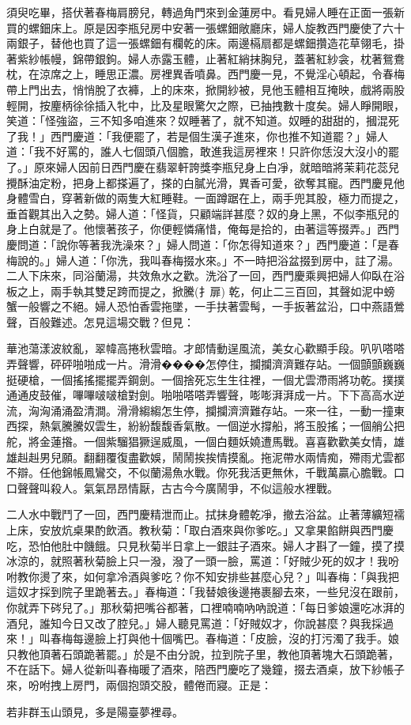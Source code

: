 須臾吃畢，搭伏著春梅肩膀兒，轉過角門來到金蓮房中。看見婦人睡在正面一張新買的螺鈿床上。原是因李瓶兒房中安著一張螺鈿敞廳床，婦人旋教西門慶使了六十兩銀子，替他也買了這一張螺鈿有欄乾的床。兩邊槅扇都是螺鈿攢造花草翎毛，掛著紫紗帳幔，錦帶銀鉤。婦人赤露玉體，止著紅綃抹胸兒，蓋著紅紗衾，枕著鴛鴦枕，在涼席之上，睡思正濃。房裡異香噴鼻。西門慶一見，不覺淫心頓起，令春梅帶上門出去，悄悄脫了衣褲，上的床來，掀開紗被，見他玉體相互掩映，戲將兩股輕開，按麈柄徐徐插入牝中，比及星眼驚欠之際，已抽拽數十度矣。婦人睜開眼，笑道：「怪強盜，三不知多咱進來？奴睡著了，就不知道。奴睡的甜甜的，摑混死了我！」西門慶道：「我便罷了，若是個生漢子進來，你也推不知道罷？」婦人道：「我不好罵的，誰人七個頭八個膽，敢進我這房裡來！只許你恁沒大沒小的罷了。」原來婦人因前日西門慶在翡翠軒誇獎李瓶兒身上白凈，就暗暗將茉莉花蕊兒攪酥油定粉，把身上都搽遍了，搽的白膩光滑，異香可愛，欲奪其寵。西門慶見他身體雪白，穿著新做的兩隻大紅睡鞋。一面蹲踞在上，兩手兜其股，極力而提之，垂首觀其出入之勢。婦人道：「怪貨，只顧端詳甚麼？奴的身上黑，不似李瓶兒的身上白就是了。他懷著孩子，你便輕憐痛惜，俺每是拾的，由著這等掇弄。」西門慶問道：「說你等著我洗澡來？」婦人問道：「你怎得知道來？」西門慶道：「是春梅說的。」婦人道：「你洗，我叫春梅掇水來。」不一時把浴盆掇到房中，註了湯。二人下床來，同浴蘭湯，共效魚水之歡。洗浴了一回，西門慶乘興把婦人仰臥在浴板之上，兩手執其雙足跨而提之，掀騰(扌扉) 乾，何止二三百回，其聲如泥中螃蟹一般響之不絕。婦人恐怕香雲拖墜，一手扶著雲髩，一手扳著盆沿，口中燕語鶯聲，百般難述。怎見這場交戰？但見：

華池蕩漾波紋亂，翠幃高捲秋雲暗。才郎情動逞風流，美女心歡顯手段。叭叭嗒嗒弄聲響，砰砰啪啪成一片。滑滑����怎停住，攔攔濟濟難存站。一個顫顫巍巍挺硬槍，一個搖搖擺擺弄鋼劍。一個捨死忘生生往裡，一個尤雲滯雨將功乾。撲撲通通皮鼓催，嗶嗶啵啵槍對劍。啪啪嗒嗒弄響聲，嘭嘭湃湃成一片。下下高高水逆流，洶洶涌涌盈清澗。滑滑縐縐怎生停，攔攔濟濟難存站。一來一往，一動一撞東西探，熱氣騰騰奴雲生，紛紛馥馥香氣散。一個逆水撐船，將玉股搖；一個艄公把舵，將金蓮揝。一個紫騮猖獗逞威風，一個白麵妖嬈遭馬戰。喜喜歡歡美女情，雄雄赳赳男兒願。翻翻覆復盡歡娛，鬧鬧挨挨情摸亂。拖泥帶水兩情痴，殢雨尤雲都不辯。任他錦帳鳳鸞交，不似蘭湯魚水戰。你死我活更無休，千戰萬贏心膽戰。口口聲聲叫殺人。氣氣昂昂情厭，古古今今廣鬧爭，不似這般水裡戰。

二人水中戰鬥了一回，西門慶精泄而止。拭抹身體乾凈，撤去浴盆。止著薄纊短襦上床，安放炕桌果酌飲酒。教秋菊：「取白酒來與你爹吃。」又拿果餡餅與西門慶吃，恐怕他肚中饑餓。只見秋菊半日拿上一銀註子酒來。婦人才斟了一鐘，摸了摸冰涼的，就照著秋菊臉上只一潑，潑了一頭一臉，罵道：「好賊少死的奴才！我吩咐教你燙了來，如何拿冷酒與爹吃？你不知安排些甚麼心兒？」叫春梅：「與我把這奴才採到院子里跪著去。」春梅道：「我替娘後邊捲裹腳去來，一些兒沒在跟前，你就弄下硶兒了。」那秋菊把嘴谷都著，口裡喃喃吶吶說道：「每日爹娘還吃冰湃的酒兒，誰知今日又改了腔兒。」婦人聽見罵道：「好賊奴才，你說甚麼？與我採過來！」叫春梅每邊臉上打與他十個嘴巴。春梅道：「皮臉，沒的打污濁了我手。娘只教他頂著石頭跪著罷。」於是不由分說，拉到院子里，教他頂著塊大石頭跪著，不在話下。婦人從新叫春梅暖了酒來，陪西門慶吃了幾鐘，掇去酒桌，放下紗帳子來，吩咐拽上房門，兩個抱頭交股，體倦而寢。正是：

若非群玉山頭見，多是陽臺夢裡尋。


